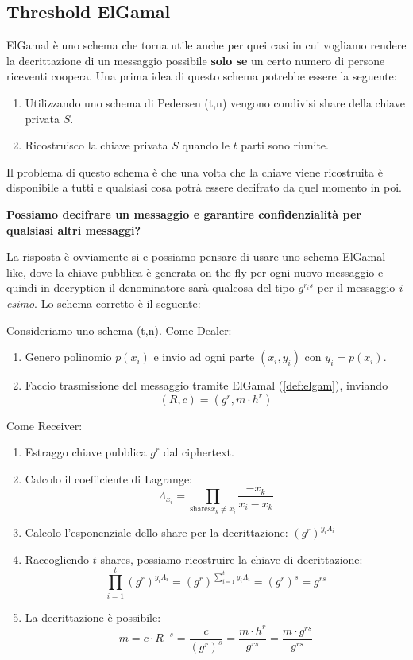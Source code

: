 \subsection{Threshold ElGamal}
ElGamal è uno schema che torna utile anche per quei casi in cui vogliamo rendere la decrittazione di un messaggio possibile \textbf{solo se} un certo numero di persone riceventi coopera. Una prima idea di questo schema potrebbe essere la seguente:
\begin{enumerate}
    \item Utilizzando uno schema di Pedersen (t,n) vengono condivisi share della chiave privata $S$.
    \item Ricostruisco la chiave privata $S$ quando le $t$ parti sono riunite.
\end{enumerate}
Il problema di questo schema è che una volta che la chiave viene ricostruita è disponibile a tutti e qualsiasi cosa potrà essere decifrato da quel momento in poi.
\begin{problem}
\textbf{Possiamo decifrare un messaggio e garantire confidenzialità per qualsiasi altri messaggi?}
\end{problem}
La risposta è ovviamente si e possiamo pensare di usare uno schema ElGamal-like, dove la chiave pubblica è generata on-the-fly per ogni nuovo messaggio e quindi in decryption il denominatore sarà qualcosa del tipo $g^{r_is}$ per il messaggio \textit{i-esimo}. Lo schema corretto è il seguente:
\begin{definition}\label{def:treshelg}
Consideriamo uno schema (t,n).
Come Dealer:
\begin{enumerate}
    \item Genero polinomio $p(x_i)$ e invio ad ogni parte $(x_i, y_i)$ con $y_i=p(x_i)$.
    \item Faccio trasmissione del messaggio tramite ElGamal (\cref{def:elgam}), inviando 
    \[ (R,c)=(g^r,m\cdot h^r)\]
\end{enumerate}
Come Receiver:
\begin{enumerate}
    \item Estraggo chiave pubblica $g^r$ dal ciphertext.
    \item Calcolo il coefficiente di Lagrange:
    \[\Lambda_{x_i}=\prod_{\text{shares} x_k\ne x_i}\frac{-x_k}{x_i-x_k}\]
    \item Calcolo l'esponenziale dello share per la decrittazione: $(g^r)^{y_i\Lambda_i}$
    \item Raccogliendo $t$ shares, possiamo ricostruire la chiave di decrittazione:
    \[\prod_{i=1}^{t}(g^r)^{y_i\Lambda_i}=(g^r)^{\sum_{i=1}^{t}{y_i\Lambda_i}}=(g^r)^s=g^{rs}\]
    \item La decrittazione è possibile: 
    \[m=c\cdot R^{-s}=\frac{c}{(g^r)^s}=\frac{m\cdot h^r}{g^{rs}}=\frac{m\cdot g^{rs}}{g^{rs}}\]
\end{enumerate}
\end{definition}
